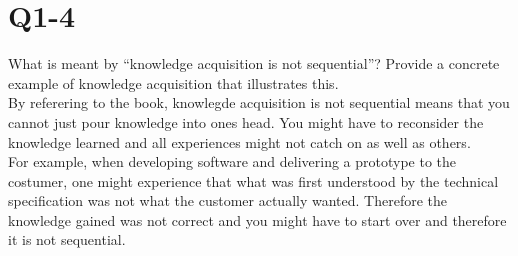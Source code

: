 \section{Q1-4}
What is meant by “knowledge acquisition is not sequential”? Provide a concrete example of knowledge acquisition that illustrates this.\\

By referering to the book, knowlegde acquisition is not sequential means that you cannot just pour knowledge into ones head. You might have to reconsider the knowledge learned and all experiences might not catch on as well as others.\\

For example, when developing software and delivering a prototype to the costumer, one might experience that what was first understood by the technical specification was not what the customer actually wanted. Therefore the knowledge gained was not correct and you might have to start over and therefore it is not sequential.